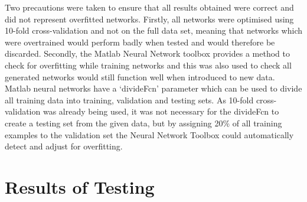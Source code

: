 \documentclass[a4paper]{article}
\begin{document}
Two precautions were taken to ensure that all results obtained were correct and did not represent overfitted networks. Firstly, all networks were
optimised using 10-fold cross-validation and not on the full data set, meaning that networks which were overtrained would perform badly when tested
and would therefore be discarded. Secondly, the Matlab Neural Network toolbox provides a method to check for overfitting while training networks and
this was also used to check all generated networks would still function well when introduced to new data. Matlab neural networks have a `divideFcn'
parameter which can be used to divide all training data into training, validation and testing sets. As 10-fold cross-validation was already being
used, it was not necessary for the divideFcn to create a testing set from the given data, but by assigning 20\% of all training examples to the
validation set the Neural Network Toolbox could automatically detect and adjust for overfitting.\\ 

\newpage


\section{Results of Testing}
\end{document}
